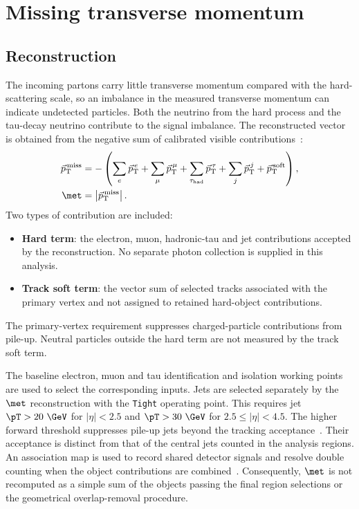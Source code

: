 \section{Missing transverse momentum}
\label{sec:ch6_met}

\subsection{Reconstruction}

The incoming partons carry little transverse momentum compared with the hard-scattering scale, so an imbalance in the measured transverse momentum can indicate undetected particles.
Both the neutrino from the hard process and the tau-decay neutrino contribute to the signal imbalance.
The reconstructed vector is obtained from the negative sum of calibrated visible contributions~\cite{ATLAS2025METPerformance}:
\begin{align}
    \vec p_{\mathrm{T}}^{\,\mathrm{miss}}
    &=-\left(
    \sum_e\vec p_{\mathrm{T}}^{\,e}
    +\sum_\mu\vec p_{\mathrm{T}}^{\,\mu}
    +\sum_{\tau_{\mathrm{had}}}\vec p_{\mathrm{T}}^{\,\tau}
    +\sum_j\vec p_{\mathrm{T}}^{\,j}
    +\vec p_{\mathrm{T}}^{\,\mathrm{soft}}
    \right),
    \label{eq:ch6_met_vector}\\
    \met&=\left|\vec p_{\mathrm{T}}^{\,\mathrm{miss}}\right|.
    \label{eq:ch6_met_magnitude}
\end{align}
Two types of contribution are included:
\begin{itemize}
    \item \textbf{Hard term}: the electron, muon, hadronic-tau and jet contributions accepted by the reconstruction. No separate photon collection is supplied in this analysis.
    \item \textbf{Track soft term}: the vector sum of selected tracks associated with the primary vertex and not assigned to retained hard-object contributions.
\end{itemize}
The primary-vertex requirement suppresses charged-particle contributions from pile-up.
Neutral particles outside the hard term are not measured by the track soft term.

The baseline electron, muon and tau identification and isolation working points are used to select the corresponding inputs.
Jets are selected separately by the $\met$ reconstruction with the \texttt{Tight} operating point.
This requires jet $\pT>20~\GeV$ for $|\eta|<2.5$ and $\pT>30~\GeV$ for $2.5\leq|\eta|<4.5$.
The higher forward threshold suppresses pile-up jets beyond the tracking acceptance~\cite{ATLAS2025METPerformance}.
Their acceptance is distinct from that of the central jets counted in the analysis regions.
An association map is used to record shared detector signals and resolve double counting when the object contributions are combined~\cite{ATLAS2025METPerformance}.
Consequently, $\met$ is not recomputed as a simple sum of the objects passing the final region selections or the geometrical overlap-removal procedure.

